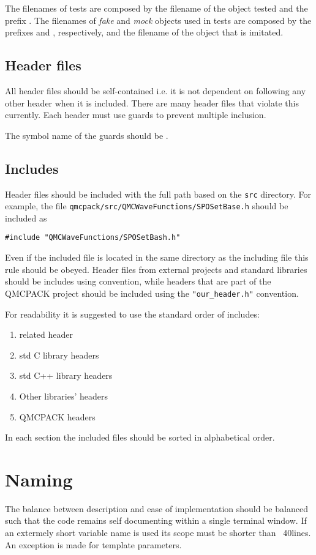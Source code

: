 The filenames of tests are composed by the filename of the object tested and the prefix .
The filenames of \emph{fake} and \emph{mock} objects used in tests are composed by the prefixes  and , respectively, and the filename of the object that is imitated.

\subsection{Header files}
All header files should be self-contained i.e. it is not dependent on following any other header when it is included. There are many header files that violate this currently.
Each header must use  guards to prevent multiple inclusion.

The symbol name of the  guards should be .

\subsection{Includes}
Header files should be included with the full path based on the \verb|src| directory.
For example, the file \verb|qmcpack/src/QMCWaveFunctions/SPOSetBase.h| should be included as
\begin{lstlisting}
#include "QMCWaveFunctions/SPOSetBash.h"
\end{lstlisting}
Even if the included file is located in the same directory as the including file this rule should be obeyed. Header files from external projects and standard libraries should be includes using  convention, while headers that are part of the QMCPACK project should be included using the \verb|"our_header.h"| convention.

For readability it is suggested to use the standard order of includes:
\begin{enumerate}
	\item related header
	\item std C library headers
	\item std C++ library headers
	\item Other libraries' headers
	\item QMCPACK headers
\end{enumerate}

In each section the included files should be sorted in alphabetical order.

\section{Naming}
The balance between description and ease of implementation should be balanced such that the code remains self documenting within a single terminal window.  If an extermely short variable name is used its scope must be shorter than ~40lines. An exception is made for template parameters.

